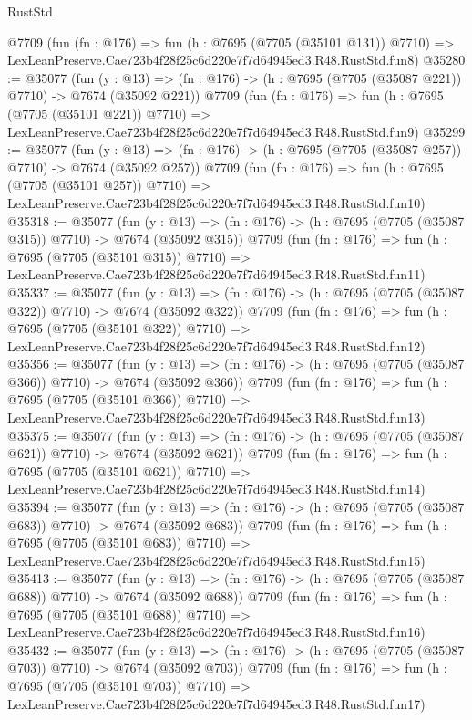 \begin{lexlean}{RustStd}
\begin{coremodule}
    @7709
    (fun (fn : @176) =>
    fun (h : @7695 (@7705 (@35101 @131)) @7710) =>
    LexLeanPreserve.Cae723b4f28f25c6d220e7f7d64945ed3.R48.RustStd.fun8)
@35280 := @35077
    (fun (y : @13) => (fn : @176) -> (h : @7695 (@7705 (@35087 @221)) @7710) -> @7674 (@35092 @221))
    @7709
    (fun (fn : @176) =>
    fun (h : @7695 (@7705 (@35101 @221)) @7710) =>
    LexLeanPreserve.Cae723b4f28f25c6d220e7f7d64945ed3.R48.RustStd.fun9)
@35299 := @35077
    (fun (y : @13) => (fn : @176) -> (h : @7695 (@7705 (@35087 @257)) @7710) -> @7674 (@35092 @257))
    @7709
    (fun (fn : @176) =>
    fun (h : @7695 (@7705 (@35101 @257)) @7710) =>
    LexLeanPreserve.Cae723b4f28f25c6d220e7f7d64945ed3.R48.RustStd.fun10)
@35318 := @35077
    (fun (y : @13) => (fn : @176) -> (h : @7695 (@7705 (@35087 @315)) @7710) -> @7674 (@35092 @315))
    @7709
    (fun (fn : @176) =>
    fun (h : @7695 (@7705 (@35101 @315)) @7710) =>
    LexLeanPreserve.Cae723b4f28f25c6d220e7f7d64945ed3.R48.RustStd.fun11)
@35337 := @35077
    (fun (y : @13) => (fn : @176) -> (h : @7695 (@7705 (@35087 @322)) @7710) -> @7674 (@35092 @322))
    @7709
    (fun (fn : @176) =>
    fun (h : @7695 (@7705 (@35101 @322)) @7710) =>
    LexLeanPreserve.Cae723b4f28f25c6d220e7f7d64945ed3.R48.RustStd.fun12)
@35356 := @35077
    (fun (y : @13) => (fn : @176) -> (h : @7695 (@7705 (@35087 @366)) @7710) -> @7674 (@35092 @366))
    @7709
    (fun (fn : @176) =>
    fun (h : @7695 (@7705 (@35101 @366)) @7710) =>
    LexLeanPreserve.Cae723b4f28f25c6d220e7f7d64945ed3.R48.RustStd.fun13)
@35375 := @35077
    (fun (y : @13) => (fn : @176) -> (h : @7695 (@7705 (@35087 @621)) @7710) -> @7674 (@35092 @621))
    @7709
    (fun (fn : @176) =>
    fun (h : @7695 (@7705 (@35101 @621)) @7710) =>
    LexLeanPreserve.Cae723b4f28f25c6d220e7f7d64945ed3.R48.RustStd.fun14)
@35394 := @35077
    (fun (y : @13) => (fn : @176) -> (h : @7695 (@7705 (@35087 @683)) @7710) -> @7674 (@35092 @683))
    @7709
    (fun (fn : @176) =>
    fun (h : @7695 (@7705 (@35101 @683)) @7710) =>
    LexLeanPreserve.Cae723b4f28f25c6d220e7f7d64945ed3.R48.RustStd.fun15)
@35413 := @35077
    (fun (y : @13) => (fn : @176) -> (h : @7695 (@7705 (@35087 @688)) @7710) -> @7674 (@35092 @688))
    @7709
    (fun (fn : @176) =>
    fun (h : @7695 (@7705 (@35101 @688)) @7710) =>
    LexLeanPreserve.Cae723b4f28f25c6d220e7f7d64945ed3.R48.RustStd.fun16)
@35432 := @35077
    (fun (y : @13) => (fn : @176) -> (h : @7695 (@7705 (@35087 @703)) @7710) -> @7674 (@35092 @703))
    @7709
    (fun (fn : @176) =>
    fun (h : @7695 (@7705 (@35101 @703)) @7710) =>
    LexLeanPreserve.Cae723b4f28f25c6d220e7f7d64945ed3.R48.RustStd.fun17)

\end{coremodule}
\end{lexlean}

